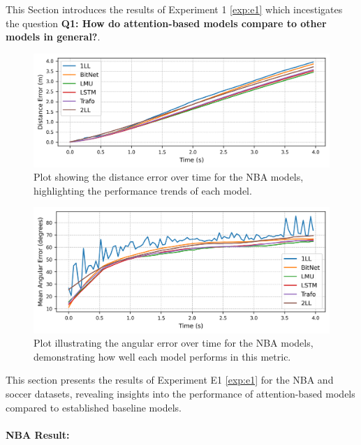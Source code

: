This Section introduces the results of Experiment 1 \ref{exp:e1} which incestigates the question \textbf{Q1: How do attention-based models compare to other models in general?}.
\label{exp:init}
\begin{figure}[t]
    \centering
    \includegraphics[width=\linewidth]{contents/results/nba_error.png}
    \caption[Distance Error Over Time (NBA).]{Plot showing the distance error over time for the NBA models, highlighting the performance trends of each model.}    \label{fig:distance_error_nba}
\end{figure}
\begin{figure}[t]
    \centering
    \includegraphics[width=\linewidth]{contents/results/nba_angle.png}
    \caption[Angular Error Over Time (NBA).]{Plot illustrating the angular error over time for the NBA models, demonstrating how well each model performs in this metric.}
    \label{fig:angular_error_nba}
\end{figure}
This section presents the results of Experiment E1 \ref{exp:e1} for the NBA and soccer datasets, revealing insights into the performance of attention-based models compared to established baseline models.
\paragraph{NBA Result:}

